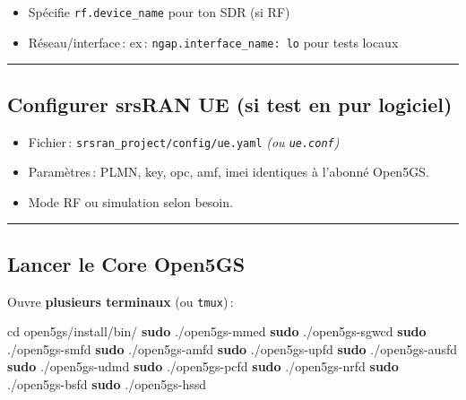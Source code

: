 \documentclass[
  french,
]{article}
\newenvironment{Shaded}{\begin{snugshade}}{\end{snugshade}}
\newcommand{\BuiltInTok}[1]{#1}
\newcommand{\FunctionTok}[1]{\textcolor[rgb]{0.13,0.29,0.53}{\textbf{#1}}}
\newcommand{\NormalTok}[1]{#1}
\providecommand{\tightlist}{%
  \setlength{\itemsep}{0pt}\setlength{\parskip}{0pt}}
\begin{document}
\begin{itemize}
\tightlist
\item
  Spécifie \texttt{rf.device\_name} pour ton SDR (si RF)
\item
  Réseau/interface\,: ex\,: \texttt{ngap.interface\_name:\ lo} pour
  tests locaux
\end{itemize}

\begin{center}\rule{0.5\linewidth}{0.5pt}\end{center}

\subsection{Configurer srsRAN UE (si test en pur
logiciel)}\label{configurer-srsran-ue-si-test-en-pur-logiciel}

\begin{itemize}
\tightlist
\item
  Fichier\,: \texttt{srsran\_project/config/ue.yaml} \emph{(ou
  \texttt{ue.conf})}
\item
  Paramètres\,: PLMN, key, opc, amf, imei identiques à l'abonné Open5GS.
\item
  Mode RF ou simulation selon besoin.
\end{itemize}

\begin{center}\rule{0.5\linewidth}{0.5pt}\end{center}

\subsection{Lancer le Core Open5GS}\label{lancer-le-core-open5gs}

Ouvre \textbf{plusieurs terminaux} (ou \texttt{tmux})\,:

\begin{Shaded}
\begin{Highlighting}[]
\BuiltInTok{cd}\NormalTok{ open5gs/install/bin/}
\FunctionTok{sudo}\NormalTok{ ./open5gs{-}mmed}
\FunctionTok{sudo}\NormalTok{ ./open5gs{-}sgwcd}
\FunctionTok{sudo}\NormalTok{ ./open5gs{-}smfd}
\FunctionTok{sudo}\NormalTok{ ./open5gs{-}amfd}
\FunctionTok{sudo}\NormalTok{ ./open5gs{-}upfd}
\FunctionTok{sudo}\NormalTok{ ./open5gs{-}ausfd}
\FunctionTok{sudo}\NormalTok{ ./open5gs{-}udmd}
\FunctionTok{sudo}\NormalTok{ ./open5gs{-}pcfd}
\FunctionTok{sudo}\NormalTok{ ./open5gs{-}nrfd}
\FunctionTok{sudo}\NormalTok{ ./open5gs{-}bsfd}
\FunctionTok{sudo}\NormalTok{ ./open5gs{-}hssd}
\end{Highlighting}
\end{Shaded}
\end{document}
